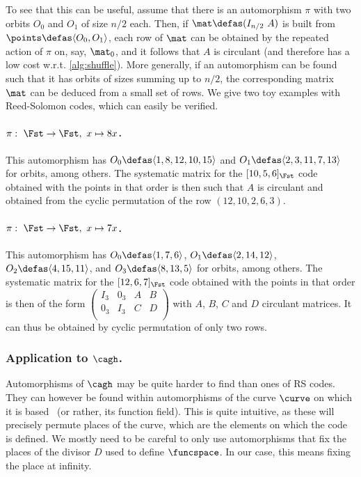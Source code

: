 To see that this can be useful, assume that there is an automorphism $\pi$ with two orbits $O_0$ and $O_1$ of size $n/2$ each. Then, if $\mat \defas (I_{n/2}~A)$ is
built from $\points \defas \langle O_0, O_1\rangle$, each row of $\mat$ can be obtained by the repeated action of $\pi$ on, say, $\mat_0$, and it follows
that $A$ is circulant (and therefore has a low cost w.r.t. \autoref{alg:shuffle}). More generally, if an automorphism can be found such that it has orbits of sizes summing up to
$n/2$, the corresponding matrix $\mat$ can be deduced from a small set of rows. We give two toy examples with Reed-Solomon codes, which can easily be verified.

\paragraph{$\pi:~\Fst \rightarrow \Fst,~x \mapsto 8 x$.} This automorphism has $O_0\defas \langle 1, 8, 12, 10, 15\rangle$
and $O_1 \defas \langle 2, 3, 11, 7, 13\rangle$ for orbits, among others. The systematic matrix for the $[10, 5, 6]_{\Fst}$ code obtained with the points in that
order is then such that $A$ is circulant and obtained from the cyclic permutation of the row $(12, 10, 2, 6, 3)$.

\paragraph{$\pi:~\Fst \rightarrow \Fst,~x \mapsto 7 x$.} This automorphism has $O_0 \defas \langle 1, 7, 6\rangle$,
$O_1 \defas \langle 2, 14, 12\rangle$, $O_2 \defas \langle 4, 15, 11\rangle$, and $O_3 \defas \langle 8, 13, 5\rangle$ for orbits, among others.
The systematic matrix for the $[12, 6, 7]_{\Fst}$ code obtained with the points in that
order is then of the form
$\begin{pmatrix}
	I_3 & 0_3 & A & B \\
	0_3 & I_3 & C & D\\
\end{pmatrix}$ with $A$, $B$, $C$ and $D$ circulant matrices. It can thus be obtained by cyclic permutation of only two rows.

\medskip

\subsubsection{Application to $\cagh$.}
Automorphisms of $\cagh$ may be quite harder to find than ones of RS codes. They can however
be found within automorphisms of the curve $\curve$ on which it is based~\cite{stichtenoth} (or rather, its function field). This is quite intuitive, as these will precisely permute
places of the curve, which are the elements on which the code is defined. We mostly need to be careful to only use automorphisms that fix the places of the divisor
$D$ used to define $\funcspace$. In our case, this means fixing the place at infinity.

